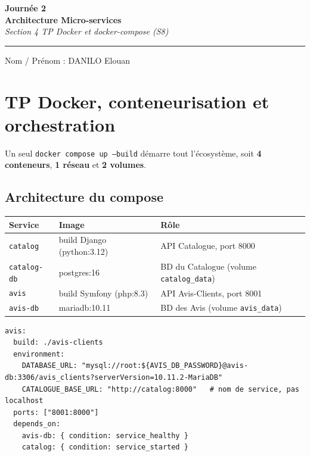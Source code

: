 \documentclass[11pt,a4paper]{article}
\begin{document}
\thispagestyle{empty}
\begin{center}
  {\LARGE\bfseries Journée 2}\\[4pt]
  {\large\bfseries Architecture Micro-services}\\[6pt]
  {\normalsize\itshape Section 4 \textperiodcentered{} TP Docker et docker-compose (S8)}\\[6pt]
\end{center}

\vspace{4pt}
\hrule
\vspace{8pt}

Nom / Prénom : DANILO Elouan

\vspace{6pt}

\setcounter{section}{3}
\section{TP Docker, conteneurisation et orchestration}

Un seul \texttt{docker compose up --build} démarre tout l'écosystème, soit \textbf{4 conteneurs}, \textbf{1 réseau} et \textbf{2 volumes}.

\subsection{Architecture du compose}

\begin{tabularx}{\textwidth}{@{}P{2.2cm} P{3.7cm} Y@{}}
\toprule
\textbf{Service} & \textbf{Image} & \textbf{Rôle} \\
\midrule
\texttt{catalog} & build Django (python:3.12) & API Catalogue, port 8000 \\[3pt]
\texttt{catalog-db} & postgres:16 & BD du Catalogue (volume \texttt{catalog\_data}) \\[3pt]
\texttt{avis} & build Symfony (php:8.3) & API Avis-Clients, port 8001 \\[3pt]
\texttt{avis-db} & mariadb:10.11 & BD des Avis (volume \texttt{avis\_data}) \\
\bottomrule
\end{tabularx}

\begin{lstlisting}
avis:
  build: ./avis-clients
  environment:
    DATABASE_URL: "mysql://root:${AVIS_DB_PASSWORD}@avis-db:3306/avis_clients?serverVersion=10.11.2-MariaDB"
    CATALOGUE_BASE_URL: "http://catalog:8000"   # nom de service, pas localhost
  ports: ["8001:8000"]
  depends_on:
    avis-db: { condition: service_healthy }
    catalog: { condition: service_started }
\end{lstlisting}
\end{document}
